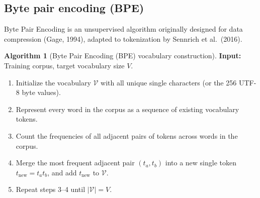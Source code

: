 \documentclass[11pt,a4paper]{article}
\newcommand{\slides}[1]{\par\nopagebreak\noindent{\normalfont\small\emph{(slides #1)}}\par\nopagebreak\vspace{2pt}}
\theoremstyle{definition}
\newtheorem{algorithm}[definition]{Algorithm}
\theoremstyle{plain}
\begin{document}
\subsection{Byte pair encoding (BPE)}\slides{6 / 84}
Byte Pair Encoding is an unsupervised algorithm originally designed for data compression (Gage, 1994), adapted to tokenization by Sennrich et al.\ (2016).

\begin{algorithm}[Byte Pair Encoding (BPE) vocabulary construction]\label{alg:bpe}
\textbf{Input:} Training corpus, target vocabulary size $V$.
\begin{enumerate}[nosep]
\item Initialize the vocabulary $\mathcal{V}$ with all unique single characters (or the 256 UTF-8 byte values).
\item Represent every word in the corpus as a sequence of existing vocabulary tokens.
\item Count the frequencies of all adjacent pairs of tokens across words in the corpus.
\item Merge the most frequent adjacent pair $(t_a, t_b)$ into a new single token $t_{\text{new}} = t_a t_b$, and add $t_{\text{new}}$ to $\mathcal{V}$.
\item Repeat steps 3--4 until $|\mathcal{V}| = V$.
\end{enumerate}
\end{algorithm}
\end{document}
